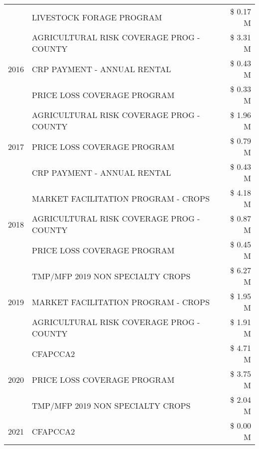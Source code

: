 \begin{tabular}{llr}
 & LIVESTOCK FORAGE PROGRAM & \$ 0.17 M \\
\cline{1-3}
\multirow[t]{3}{*}{2016} & AGRICULTURAL RISK COVERAGE PROG - COUNTY & \$ 3.31 M \\
 & CRP PAYMENT - ANNUAL RENTAL & \$ 0.43 M \\
 & PRICE LOSS COVERAGE PROGRAM & \$ 0.33 M \\
\cline{1-3}
\multirow[t]{3}{*}{2017} & AGRICULTURAL RISK COVERAGE PROG - COUNTY & \$ 1.96 M \\
 & PRICE LOSS COVERAGE PROGRAM & \$ 0.79 M \\
 & CRP PAYMENT - ANNUAL RENTAL & \$ 0.43 M \\
\cline{1-3}
\multirow[t]{3}{*}{2018} & MARKET FACILITATION PROGRAM - CROPS & \$ 4.18 M \\
 & AGRICULTURAL RISK COVERAGE PROG - COUNTY & \$ 0.87 M \\
 & PRICE LOSS COVERAGE PROGRAM & \$ 0.45 M \\
\cline{1-3}
\multirow[t]{3}{*}{2019} & TMP/MFP 2019 NON SPECIALTY CROPS & \$ 6.27 M \\
 & MARKET FACILITATION PROGRAM - CROPS & \$ 1.95 M \\
 & AGRICULTURAL RISK COVERAGE PROG - COUNTY & \$ 1.91 M \\
\cline{1-3}
\multirow[t]{3}{*}{2020} & CFAPCCA2 & \$ 4.71 M \\
 & PRICE LOSS COVERAGE PROGRAM & \$ 3.75 M \\
 & TMP/MFP 2019 NON SPECIALTY CROPS & \$ 2.04 M \\
\cline{1-3}
2021 & CFAPCCA2 & \$ 0.00 M \\
\cline{1-3}
\bottomrule
\end{tabular}
